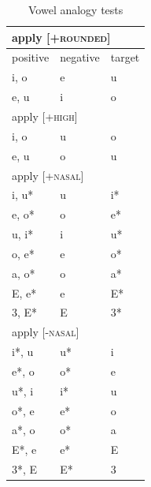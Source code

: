 \documentclass[11pt]{article}
\begin{document}
\newpage
\begin{table}[h]
\centering

\caption{Vowel analogy tests}
\begin{tabular}{ l | l | l }
\hline \multicolumn{3}{l}{apply \textsc{[+rounded]}}\\  \hline
positive & negative & target \\\hline
i, o & e & u \\
e, u & i & o \\
\hline \multicolumn{3}{l}{apply \textsc{[+high]}}\\  \hline
i, o & u & o \\
e, u & o & u \\
\hline \multicolumn{3}{l}{apply \textsc{[+nasal]}}\\  \hline
i, u* & u & i* \\
e, o* & o & e* \\
u, i* & i & u* \\
o, e* & e & o* \\
a, o* & o & a* \\
E, e* & e & E* \\
3, E* & E & 3* \\
\hline \multicolumn{3}{l}{apply \textsc{[-nasal]}}\\  \hline
i*, u & u* & i \\
e*, o & o* & e \\
u*, i & i* & u \\
o*, e & e* & o \\
a*, o & o* & a \\
E*, e & e* & E \\
3*, E & E* & 3 \\
\end{tabular}
\end{table}
\end{document}
